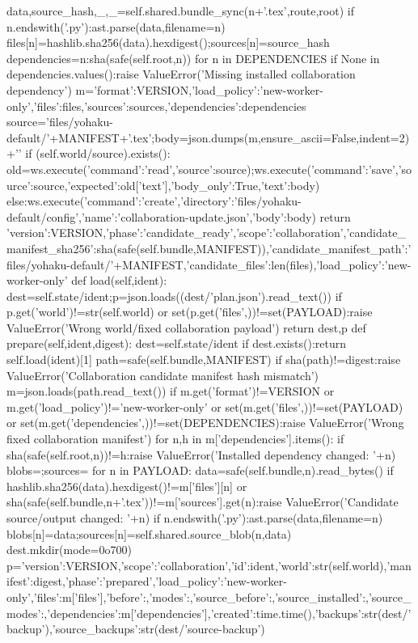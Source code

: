    data,source_hash,_,_=self.shared.bundle_sync(n+'.tex',route,root)
   if n.endswith('.py'):ast.parse(data,filename=n)
   files[n]=hashlib.sha256(data).hexdigest();sources[n]=source_hash
  dependencies={n:sha(safe(self.root,n)) for n in DEPENDENCIES}
  if None in dependencies.values():raise ValueError('Missing installed collaboration dependency')
  m={'format':VERSION,'load_policy':'new-worker-only','files':files,'sources':sources,'dependencies':dependencies}
  source='files/yohaku-default/'+MANIFEST+'.tex';body=json.dumps(m,ensure_ascii=False,indent=2)+'\n'
  if (self.world/source).exists():
   old=ws.execute({'command':'read','source':source});ws.execute({'command':'save','source':source,'expected':old['text'],'body_only':True,'text':body})
  else:ws.execute({'command':'create','directory':'files/yohaku-default/config','name':'collaboration-update.json','body':body})
  return {'version':VERSION,'phase':'candidate_ready','scope':'collaboration','candidate_manifest_sha256':sha(safe(self.bundle,MANIFEST)),'candidate_manifest_path':'files/yohaku-default/'+MANIFEST,'candidate_files':len(files),'load_policy':'new-worker-only'}
 def load(self,ident):
  dest=self.state/ident;p=json.loads((dest/'plan.json').read_text())
  if p.get('world')!=str(self.world) or set(p.get('files',{}))!=set(PAYLOAD):raise ValueError('Wrong world/fixed collaboration payload')
  return dest,p
 def prepare(self,ident,digest):
  dest=self.state/ident
  if dest.exists():return self.load(ident)[1]
  path=safe(self.bundle,MANIFEST)
  if sha(path)!=digest:raise ValueError('Collaboration candidate manifest hash mismatch')
  m=json.loads(path.read_text())
  if m.get('format')!=VERSION or m.get('load_policy')!='new-worker-only' or set(m.get('files',{}))!=set(PAYLOAD) or set(m.get('dependencies',{}))!=set(DEPENDENCIES):raise ValueError('Wrong fixed collaboration manifest')
  for n,h in m['dependencies'].items():
   if sha(safe(self.root,n))!=h:raise ValueError('Installed dependency changed: '+n)
  blobs={};sources={}
  for n in PAYLOAD:
   data=safe(self.bundle,n).read_bytes()
   if hashlib.sha256(data).hexdigest()!=m['files'][n] or sha(safe(self.bundle,n+'.tex'))!=m['sources'].get(n):raise ValueError('Candidate source/output changed: '+n)
   if n.endswith('.py'):ast.parse(data,filename=n)
   blobs[n]=data;sources[n]=self.shared.source_blob(n,data)
  dest.mkdir(mode=0o700)
  p={'version':VERSION,'scope':'collaboration','id':ident,'world':str(self.world),'manifest':digest,'phase':'prepared','load_policy':'new-worker-only','files':m['files'],'before':{},'modes':{},'source_before':{},'source_installed':{},'source_modes':{},'dependencies':m['dependencies'],'created':time.time(),'backups':str(dest/'backup'),'source_backups':str(dest/'source-backup')}

